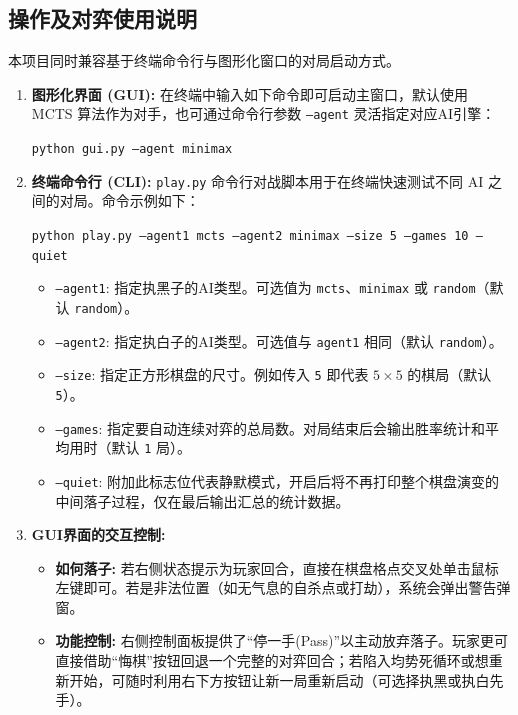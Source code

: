 \documentclass[12pt,a4paper]{ctexart}
\begin{document}
\subsection{操作及对弈使用说明}
本项目同时兼容基于终端命令行与图形化窗口的对局启动方式。
\begin{enumerate}
    \item \textbf{图形化界面 (GUI):}
    在终端中输入如下命令即可启动主窗口，默认使用 MCTS 算法作为对手，也可通过命令行参数 \texttt{--agent} 灵活指定对应AI引擎：

    \texttt{python gui.py --agent minimax} 

    \item \textbf{终端命令行 (CLI):} 
    \texttt{play.py} 命令行对战脚本用于在终端快速测试不同 AI 之间的对局。命令示例如下：

    \texttt{python play.py --agent1 mcts --agent2 minimax --size 5 --games 10 --quiet}

    \begin{itemize}
        \item \texttt{--agent1}: 指定执黑子的AI类型。可选值为 \texttt{mcts}、\texttt{minimax} 或 \texttt{random}（默认 \texttt{random}）。
        \item \texttt{--agent2}: 指定执白子的AI类型。可选值与 \texttt{agent1} 相同（默认 \texttt{random}）。
        \item \texttt{--size}: 指定正方形棋盘的尺寸。例如传入 \texttt{5} 即代表 $5\times 5$ 的棋局（默认 \texttt{5}）。
        \item \texttt{--games}: 指定要自动连续对弈的总局数。对局结束后会输出胜率统计和平均用时（默认 \texttt{1} 局）。
        \item \texttt{--quiet}: 附加此标志位代表静默模式，开启后将不再打印整个棋盘演变的中间落子过程，仅在最后输出汇总的统计数据。
    \end{itemize}
    \item \textbf{GUI界面的交互控制:} 
    \begin{itemize}
        \item \textbf{如何落子:} 若右侧状态提示为玩家回合，直接在棋盘格点交叉处单击鼠标左键即可。若是非法位置（如无气息的自杀点或打劫），系统会弹出警告弹窗。
        \item \textbf{功能控制:} 右侧控制面板提供了“停一手(Pass)”以主动放弃落子。玩家更可直接借助“悔棋”按钮回退一个完整的对弈回合；若陷入均势死循环或想重新开始，可随时利用右下方按钮让新一局重新启动（可选择执黑或执白先手）。
    \end{itemize}
\end{enumerate}
\end{document}
